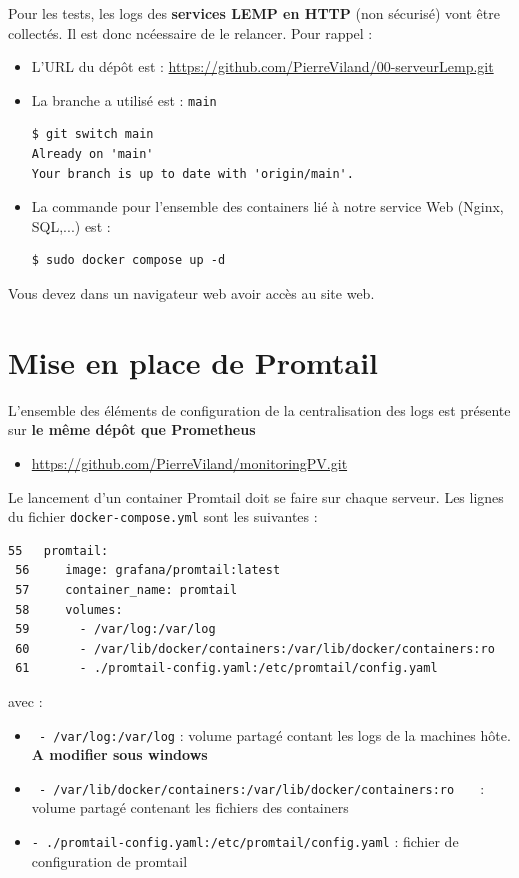 \documentclass[french, 12pt]{article}%
\newcommand{\itemE}{\item[$\bullet$]}
\begin{document}
Pour les tests, les logs des \textbf{services LEMP en HTTP} (non sécurisé) vont être collectés. Il est donc ncéessaire de le relancer. 
Pour rappel : 
\begin{itemize}
\itemE L'URL du dépôt est  : \url{https://github.com/PierreViland/00-serveurLemp.git}
\itemE La branche a utilisé est : \verb?main?
\begin{lstlisting}[style=commande]
$ git switch main
Already on 'main'
Your branch is up to date with 'origin/main'.
\end{lstlisting}

\itemE La commande pour l'ensemble des containers lié à notre service Web (Nginx, SQL,...) est : 
\begin{lstlisting}[style=commande]
$ sudo docker compose up -d
\end{lstlisting}
\end{itemize} 

Vous devez dans un navigateur web avoir accès au site web. 


\section{Mise en place de Promtail}

L'ensemble des éléments de configuration de la centralisation des logs est présente sur \textbf{ le même dépôt que Prometheus} 
\begin{itemize}
\itemE \url{https://github.com/PierreViland/monitoringPV.git}
\end{itemize}

Le lancement d'un container Promtail doit se faire sur chaque serveur. Les lignes du fichier \verb?docker-compose.yml? sont les suivantes : 

\begin{lstlisting}[style=commande]
 55   promtail:
 56     image: grafana/promtail:latest
 57     container_name: promtail
 58     volumes:
 59       - /var/log:/var/log
 60       - /var/lib/docker/containers:/var/lib/docker/containers:ro        
 61       - ./promtail-config.yaml:/etc/promtail/config.yaml
\end{lstlisting}
avec : 
\begin{itemize}
\itemE \verb? - /var/log:/var/log? : volume partagé contant les logs de la machines hôte. \textbf{A modifier sous windows}
\itemE \verb? - /var/lib/docker/containers:/var/lib/docker/containers:ro   ? : volume partagé contenant les fichiers des containers
\itemE \verb?- ./promtail-config.yaml:/etc/promtail/config.yaml?  : fichier de configuration de promtail
\end{itemize}
\end{document}

